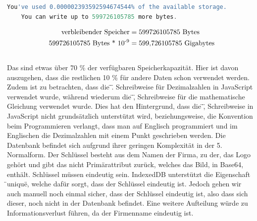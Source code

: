 \begin{lstlisting}[language=javascript,label={lst:JavaScript IndexedDB Speichergröße Ergebnis}]
    You've used 0.000002393592594674544% of the available storage.
    You can write up to 599726105785 more bytes.
\end{lstlisting}
\newline
\newline
\begin{equation}
    \begin{aligned}
       \text{verbleibender Speicher} &= \text{599726105785 Bytes}\\
       \newline
       \text{599726105785 Bytes} \text{ * 10}\textsuperscript{-9} &= \text{599,726105785 Gigabytes}\\
        \newline
        \newline
    \end{aligned}
\end{equation}
\newline
\newline
Das sind etwas über 70 \%\) der verfügbaren Speicherkapazität.
Hier ist davon auszugehen, dass die restlichen 10 \%\) für andere Daten schon verwendet werden.
Zudem ist zu betrachten, dass die \"\).\"\) Schreibweise für Dezimalzahlen in JavaScript verwendet wurde, während wiederum die \"\),\"\) Schreibweise für die mathematische Gleichung verwendet wurde.
Dies hat den Hintergrund, dass die \"\),\"\) Schreibweise in JavaScript nicht grundsätzlich unterstützt wird, beziehungsweise, die Konvention beim Programmieren verlangt, dass man auf Englisch programmiert und im Englischen die Dezimalzahlen mit einem Punkt geschrieben werden.
\newline
\newline
Die Datenbank befindet sich aufgrund ihrer geringen Komplexität in der 5. Normalform.
Der Schlüssel besteht aus dem Namen der Firma, zu der, das Logo gehört und gibt das nicht Primärattribut zurück, welches das Bild, in Base64, enthält.
Schlüssel müssen eindeutig sein.
IndexedDB unterstützt die Eigenschaft \"\)unique\"\), welche dafür sorgt, dass der Schlüssel eindeutig ist.
Jedoch gehen wir auch manuell noch einmal sicher, dass der Schlüssel eindeutig ist, also dass sich dieser, noch nicht in der Datenbank befindet.
Eine weitere Aufteilung würde zu Informationsverlust führen, da der Firmenname eindeutig ist.
\newline
\newline
